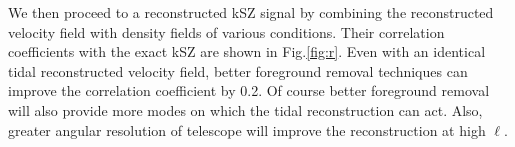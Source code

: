 We then proceed to a reconstructed kSZ signal by combining the reconstructed velocity field with density fields of various conditions. Their correlation coefficients with the exact kSZ are shown in Fig.\ref{fig:r}. Even with an identical tidal reconstructed velocity field, better foreground removal techniques can improve the correlation coefficient by 0.2. Of course better foreground removal will also provide more modes on which the tidal reconstruction can act. Also, greater angular resolution of telescope will improve the reconstruction at high $\ell$. 
